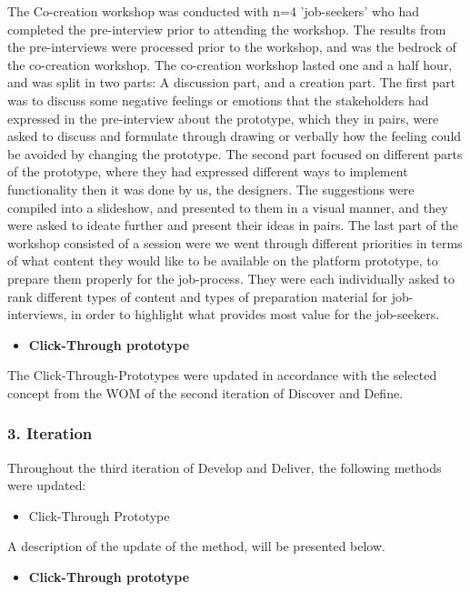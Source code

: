 The Co-creation workshop was conducted with n=4 'job-seekers' who had completed the pre-interview prior to attending the workshop. The results from the pre-interviews were processed prior to the workshop, and was the bedrock of the co-creation workshop. The co-creation workshop lasted one and a half hour, and was split in two parts: A discussion part, and a creation part. The first part was to discuss some negative feelings or emotions that the stakeholders had expressed in the pre-interview about the prototype, which they in pairs, were asked to discuss and formulate through drawing or verbally how the feeling could be avoided by changing the prototype. The second part focused on different parts of the prototype, where they had expressed different ways to implement functionality then it was done by us, the designers. The suggestions were compiled into a slideshow, and presented to them in a visual manner, and they were asked to ideate further and present their ideas in pairs. The last part of the workshop consisted of a session were we went through different priorities in terms of what content they would like to be available on the platform prototype, to prepare them properly for the job-process. They were each individually asked to rank different types of content and types of preparation material for job-interviews, in order to highlight what provides most value for the job-seekers.

\begin{itemize}
    \item \bf{Click-Through prototype}
\end{itemize}

The Click-Through-Prototypes were updated in accordance with the selected concept from the WOM of the second iteration of Discover and Define.

\subsubsection{3. Iteration}
\label{Develop and Deliver-3}

Throughout the third iteration of Develop and Deliver, the following methods were updated:

\begin{itemize}
    \item Click-Through Prototype
\end{itemize}

A description of the update of the method, will be presented below.

\begin{itemize}
    \item \bf{Click-Through prototype}
\end{itemize}

